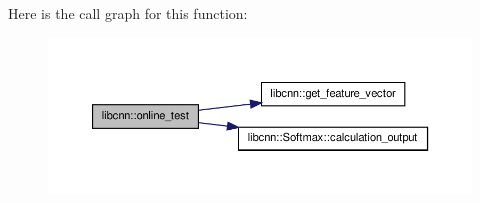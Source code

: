\-Here is the call graph for this function\-:
\nopagebreak
\begin{figure}[H]
\begin{center}
\leavevmode
\includegraphics[width=350pt]{namespacelibcnn_a493fb452cedcc704e189ad1a3656c0ad_cgraph}
\end{center}
\end{figure}


